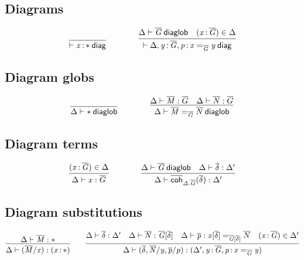 \subsection{Diagrams}

\begin{small}
  \[
  \infer{\wfdiag{\tptm{x}{\diagbase}}}{}
  \qquad\qquad
  \infer{\wfdiag{\Delta,\tptm{y}{\diag G},\tptm{p}{\homj{\diag{G}}{x}{y}}}}
  {\wfdiaglob{\Delta}{\diag G}
    & (\tptm{x}{\diag{G}}) \in \Delta}\]
\end{small}

\subsection{Diagram globs}

\begin{small}
  \[
  \infer{\wfdiaglob{\Delta}{\diagbase}}
  {}%
  \qquad\qquad
  \infer{\wfdiaglob{\Delta}{\homj{\diag G}{\diag M}{\diag N}}}
  {\ofdiaglob{\Delta}{\diag M}{\diag G}
    & \ofdiaglob{\Delta}{\diag N}{\diag G}}
  \]
\end{small}

\subsection{Diagram terms}

\begin{small}
  \[
  \infer{\ofdiaglob{\Delta}{x}{\diag G}}
  {(\tptm{x}{\diag G})\in\Delta}
  \qquad\qquad
  \infer{\ofdiaglob{\Delta}{\diagcoh{\Delta.\diag G}{\diag\delta}}{\Delta'}}
  {\wfdiaglob{\Delta}{\diag G}
    & \substdiaglob{\Delta}{\diag\delta}{\Delta'}}
  \]
\end{small}

\subsection{Diagram substitutions}

\begin{small}
  \[
  \infer{\substdiaglob{\Delta}{(\diag M/x)}{(\tptm{x}{\diagbase})}}
  {\ofdiaglob{\Delta}{\diag M}{\diagbase}}
  \qquad
  \infer{\substdiaglob{\Delta}{(\diag \delta,\diag N/y, \diag p/p)}
    {(\Delta',\tptm{y}{\diag G},\tptm{p}{\homj{\diag{G}}{x}{y}})}}
  {\substdiaglob{\Delta}{\diag \delta}{\Delta'}
    & \ofdiaglob{\Delta}{\diag N}{\tsubst{\diag G}{\diag \delta}}
    & \ofdiaglob{\Delta}{\diag p}{\homj{\tsubst{\diag G}{\diag\delta}}
      {\tsubst{x}{\diag \delta}}{\diag N}}
    & (\tptm{x}{\diag G})\in\Delta'}
  \]
\end{small}

